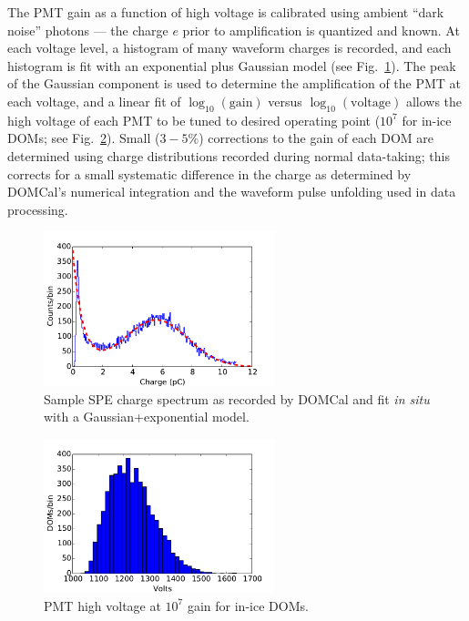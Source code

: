 The PMT gain as a function of high voltage is calibrated using ambient
``dark noise'' photons --- the charge $e$ prior to amplification is quantized
and known.  At each voltage level, a histogram of many waveform charges is recorded,
and each histogram is fit with an exponential plus Gaussian model (see
Fig.~\ref{fig:domcal_hvfit}).  The peak of the Gaussian component is used to
determine the amplification of the PMT at each voltage, and a linear fit
of $\log_{10}(\mathrm{gain})$ versus $\log_{10}(\mathrm{voltage})$ allows
the high voltage of each PMT to be tuned to desired operating point ($10^7$
for in-ice DOMs; see Fig.~\ref{fig:domcal_hv_settings}).  Small ($3-5\%$)
corrections to the gain of each DOM are determined using charge
distributions recorded during normal data-taking; this corrects for a small
systematic difference in the charge as determined by DOMCal's numerical
integration and the waveform pulse unfolding used in data processing.

\begin{figure}[!h]
 \centering
 \includegraphics[width=0.6\textwidth]{graphics/dom/domcal/hvfit.pdf}
 \caption{Sample SPE charge spectrum as recorded by DOMCal and fit
   \textit{in situ} with a Gaussian+exponential model.} 
 \label{fig:domcal_hvfit}
\end{figure}

\begin{figure}[!h]
 \centering
 \includegraphics[width=0.6\textwidth]{graphics/dom/domcal/inice_hv_2016.pdf}
 \caption{PMT high voltage at $10^7$ gain for in-ice DOMs.}
 \label{fig:domcal_hv_settings}
\end{figure}

